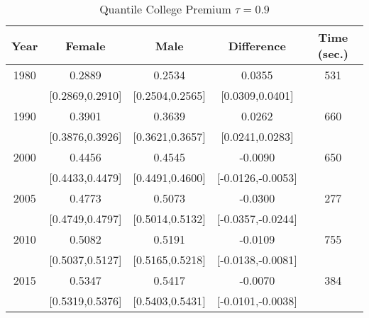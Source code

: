 \begin{table}[ht]
\centering
\begin{tabular}{ccccc}
  \hline
Year & Female & Male & Difference & Time (sec.) \\ 
  \hline
1980 & 0.2889 & 0.2534 & 0.0355 & 531 \\ 
   & [0.2869,0.2910] & [0.2504,0.2565] & [0.0309,0.0401] &  \\ 
  1990 & 0.3901 & 0.3639 & 0.0262 & 660 \\ 
   & [0.3876,0.3926] & [0.3621,0.3657] & [0.0241,0.0283] &  \\ 
  2000 & 0.4456 & 0.4545 & -0.0090 & 650 \\ 
   & [0.4433,0.4479] & [0.4491,0.4600] & [-0.0126,-0.0053] &  \\ 
  2005 & 0.4773 & 0.5073 & -0.0300 & 277 \\ 
   & [0.4749,0.4797] & [0.5014,0.5132] & [-0.0357,-0.0244] &  \\ 
  2010 & 0.5082 & 0.5191 & -0.0109 & 755 \\ 
   & [0.5037,0.5127] & [0.5165,0.5218] & [-0.0138,-0.0081] &  \\ 
  2015 & 0.5347 & 0.5417 & -0.0070 & 384 \\ 
   & [0.5319,0.5376] & [0.5403,0.5431] & [-0.0101,-0.0038] &  \\ 
   \hline
\end{tabular}
\caption{Quantile College Premium $\tau=0.9$} 
\end{table}
